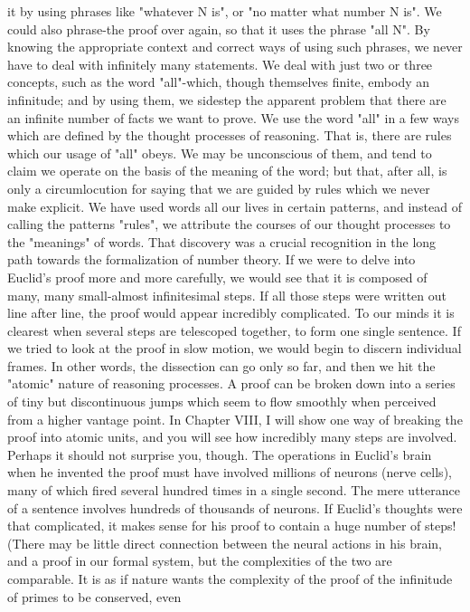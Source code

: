 it by using phrases like "whatever N is", or "no matter what number N is". We could also
phrase-the proof over again, so that it uses the phrase "all N". By knowing the appropriate
context and correct ways of using such phrases, we never have to deal with infinitely
many statements. We deal with just two or three concepts, such as the word "all"-which,
though themselves finite, embody an infinitude; and by using them, we sidestep the
apparent problem that there are an infinite number of facts we want to prove.
         We use the word "all" in a few ways which are defined by the thought processes
of reasoning. That is, there are rules which our usage of "all" obeys. We may be
unconscious of them, and tend to claim we operate on the basis of the meaning of the
word; but that, after all, is only a circumlocution for saying that we are guided by rules
which we never make explicit. We have used words all our lives in certain patterns, and
instead of calling the patterns "rules", we attribute the courses of our thought processes to
the "meanings" of words. That discovery was a crucial recognition in the long path
towards the formalization of number theory.
         If we were to delve into Euclid's proof more and more carefully, we would see
that it is composed of many, many small-almost infinitesimal steps. If all those steps were
written out line after line, the proof would appear incredibly complicated. To our minds it
is clearest when several steps are telescoped together, to form one single sentence. If we
tried to look at the proof in slow motion, we would begin to discern individual frames. In
other words, the dissection can go only so far, and then we hit the "atomic" nature of
reasoning processes. A proof can be broken down into a series of tiny but discontinuous
jumps which seem to flow smoothly when perceived from a higher vantage point. In
Chapter VIII, I will show one way of breaking the proof into atomic units, and you will
see how incredibly many steps are involved. Perhaps it should not surprise you, though.
The operations in Euclid's brain when he invented the proof must have involved millions
of neurons (nerve cells), many of which fired several hundred times in a single second.
The mere utterance of a sentence involves hundreds of thousands of neurons. If Euclid's
thoughts were that complicated, it makes sense for his proof to contain a huge number of
steps! (There may be little direct connection between the neural actions in his brain, and a
proof in our formal system, but the complexities of the two are comparable. It is as if
nature wants the complexity of the proof of the infinitude of primes to be conserved, even
